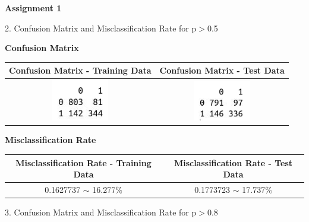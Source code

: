 \documentclass[a4paper,10pt]{article}
\begin{document}
\textbf{Assignment 1} \par
2. Confusion Matrix and Misclassification Rate for p$>$0.5 \par
\begin{center}
	\textbf{Confusion Matrix} \par
	\begin{tabular}{|c|c|}
		\hline
		Confusion Matrix - Training Data&
		Confusion Matrix - Test Data\\
		\hline
		\cellcolor{yellow!100} \includegraphics[width=25mm,scale=0.10]{Confusion_Matrix_training_Data_1.png} &
		\cellcolor{yellow!100} \includegraphics[width=25mm,scale=0.10]{Confusion_Matrix_test_Data_1.png}\\
		\hline
\end{tabular}\par \par
	\textbf{Misclassification Rate} \par
	\begin{tabular}{|c|c|}
		\hline
		Misclassification Rate - Training Data&
		Misclassification Rate - Test Data\\
		\hline
		\cellcolor{yellow!100} 0.1627737 $\sim$ 16.277\% & \cellcolor{yellow!100} 0.1773723 $\sim$ 17.737\%\\
		\hline
	\end{tabular}\par
\end{center} \par
\vspace{0.5cm}
3. Confusion Matrix and Misclassification Rate for p$>$0.8 \par
\end{document}
